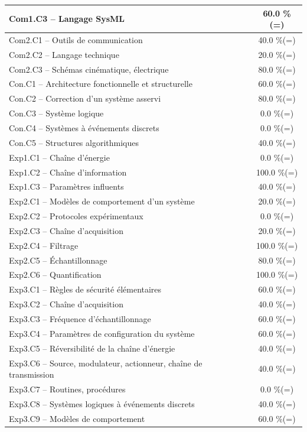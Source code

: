 \begin{center}
\begin{tabular}{|p{.7\linewidth}|c|}
Com1.C3 -- Langage SysML&60.0 \%(=)\\ \hline 
Com2.C1 -- Outils de communication&40.0 \%(=)\\ \hline 
Com2.C2 -- Langage technique&20.0 \%(=)\\ \hline 
Com2.C3 -- Schémas cinématique, électrique&80.0 \%(=)\\ \hline 
Con.C1 -- Architecture fonctionnelle et structurelle&60.0 \%(=)\\ \hline 
Con.C2 -- Correction d’un système asservi&80.0 \%(=)\\ \hline 
Con.C3 -- Système logique&0.0 \%(=)\\ \hline 
Con.C4 -- Systèmes à événements discrets&0.0 \%(=)\\ \hline 
Con.C5 -- Structures algorithmiques&40.0 \%(=)\\ \hline 
Exp1.C1 -- Chaîne d’énergie&0.0 \%(=)\\ \hline 
Exp1.C2 -- Chaîne d’information&100.0 \%(=)\\ \hline 
Exp1.C3 -- Paramètres influents&40.0 \%(=)\\ \hline 
Exp2.C1 -- Modèles de comportement d’un système&20.0 \%(=)\\ \hline 
Exp2.C2 -- Protocoles expérimentaux&0.0 \%(=)\\ \hline 
Exp2.C3 -- Chaîne d’acquisition&20.0 \%(=)\\ \hline 
Exp2.C4 -- Filtrage&100.0 \%(=)\\ \hline 
Exp2.C5 -- Échantillonnage&80.0 \%(=)\\ \hline 
Exp2.C6 -- Quantification&100.0 \%(=)\\ \hline 
Exp3.C1 -- Règles de sécurité élémentaires&60.0 \%(=)\\ \hline 
Exp3.C2 -- Chaîne d'acquisition&40.0 \%(=)\\ \hline 
Exp3.C3 -- Fréquence d’échantillonnage&60.0 \%(=)\\ \hline 
Exp3.C4 -- Paramètres de configuration du système&60.0 \%(=)\\ \hline 
Exp3.C5 -- Réversibilité de la chaîne d’énergie&40.0 \%(=)\\ \hline 
Exp3.C6 -- Source, modulateur, actionneur, chaîne de transmission&40.0 \%(=)\\ \hline 
Exp3.C7 -- Routines, procédures &0.0 \%(=)\\ \hline 
Exp3.C8 -- Systèmes logiques à événements discrets&40.0 \%(=)\\ \hline 
Exp3.C9 -- Modèles de comportement&60.0 \%(=)\\ \hline 

\end{tabular}
\end{center}
